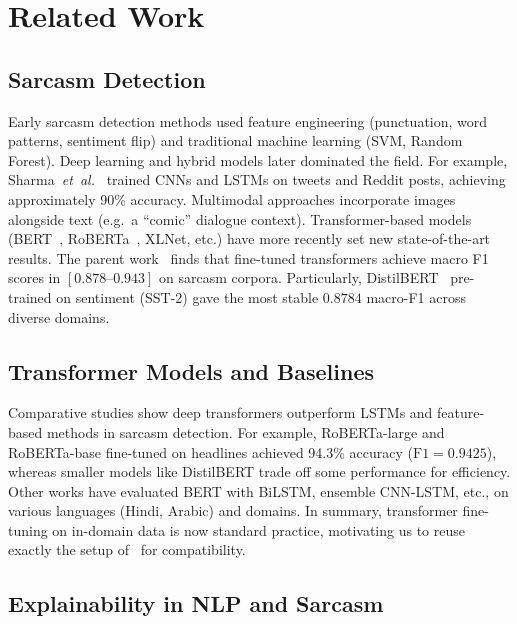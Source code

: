 
\section{Related Work}\label{sec:related_work}

\subsection{Sarcasm Detection}\label{subsec:sarcasm_detection}

Early sarcasm detection methods used feature engineering (punctuation, word patterns, sentiment flip) and traditional machine learning (SVM, Random Forest). Deep learning and hybrid models later dominated the field. For example, Sharma~\emph{et~al.}~\cite{sharma2020deep} trained CNNs and LSTMs on tweets and Reddit posts, achieving approximately 90\% accuracy. Multimodal approaches incorporate images alongside text (e.g.\ a ``comic'' dialogue context). Transformer-based models (BERT~\cite{devlin2019bert}, RoBERTa~\cite{liu2019roberta}, XLNet, etc.) have more recently set new state-of-the-art results. The parent work~\cite{oprea2025llm} finds that fine-tuned transformers achieve macro F1 scores in $[0.878\text{--}0.943]$ on sarcasm corpora. Particularly, DistilBERT~\cite{sanh2019distilbert} pre-trained on sentiment (SST-2) gave the most stable $0.8784$ macro-F1 across diverse domains.

\subsection{Transformer Models and Baselines}\label{subsec:transformer_baselines}

Comparative studies show deep transformers outperform LSTMs and feature-based methods in sarcasm detection. For example, RoBERTa-large and RoBERTa-base fine-tuned on headlines achieved 94.3\% accuracy ($\text{F1} = 0.9425$), whereas smaller models like DistilBERT trade off some performance for efficiency. Other works have evaluated BERT with BiLSTM, ensemble CNN-LSTM, etc., on various languages (Hindi, Arabic) and domains. In summary, transformer fine-tuning on in-domain data is now standard practice, motivating us to reuse exactly the setup of~\cite{oprea2025llm} for compatibility.

\subsection{Explainability in NLP and Sarcasm}\label{subsec:xai_nlp}

